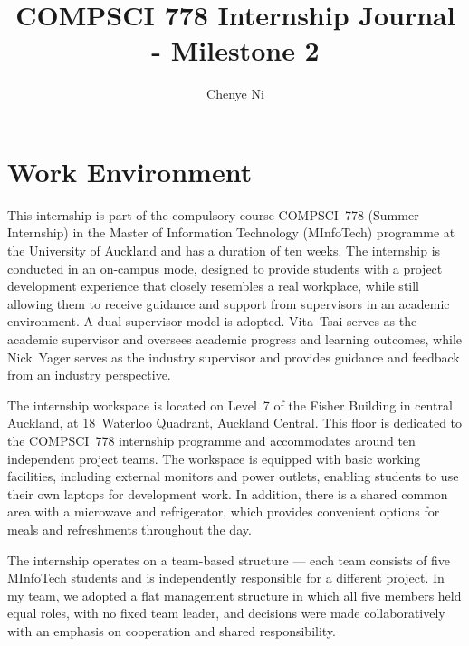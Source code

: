 \documentclass[sigconf]{acmart}
\begin{document}
\title{COMPSCI 778 Internship Journal - Milestone 2}

\author{Chenye Ni}


\maketitle


\section{Work Environment}

This internship is part of the compulsory course COMPSCI~778 (Summer Internship) in the Master of Information Technology (MInfoTech) programme at the University of Auckland and has a duration of ten weeks. The internship is conducted in an on-campus mode, designed to provide students with a project development experience that closely resembles a real workplace, while still allowing them to receive guidance and support from supervisors in an academic environment. A dual-supervisor model is adopted. Vita~Tsai serves as the academic supervisor and oversees academic progress and learning outcomes, while Nick~Yager serves as the industry supervisor and provides guidance and feedback from an industry perspective.

The internship workspace is located on Level~7 of the Fisher Building in central Auckland, at 18~Waterloo Quadrant, Auckland Central. This floor is dedicated to the COMPSCI~778 internship programme and accommodates around ten independent project teams. The workspace is equipped with basic working facilities, including external monitors and power outlets, enabling students to use their own laptops for development work. In addition, there is a shared common area with a microwave and refrigerator, which provides convenient options for meals and refreshments throughout the day.

The internship operates on a team-based structure --- each team consists of five MInfoTech students and is independently responsible for a different project. In my team, we adopted a flat management structure in which all five members held equal roles, with no fixed team leader, and decisions were made collaboratively with an emphasis on cooperation and shared responsibility.
\end{document}
